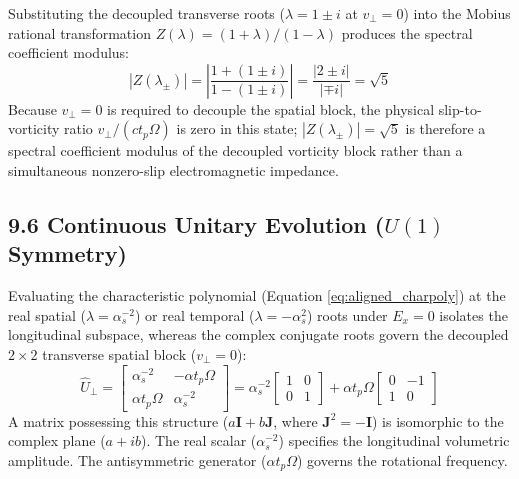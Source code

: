 Substituting the decoupled transverse roots ($\lambda = 1 \pm i$ at $v_\perp = 0$) into the Mobius rational transformation $Z(\lambda) = (1 + \lambda)/(1 - \lambda)$ produces the spectral coefficient modulus: %
\begin{equation}
    |Z(\lambda_\pm)| = \left| \frac{1 + (1 \pm i)}{1 - (1 \pm i)} \right| = \frac{|2 \pm i|}{|\mp i|} = \sqrt{5} %
\end{equation}
Because $v_\perp = 0$ is required to decouple the spatial block, the physical slip-to-vorticity ratio $v_\perp / (c t_p \Omega)$ is zero in this state; $|Z(\lambda_\pm)| = \sqrt{5}$ is therefore a spectral coefficient modulus of the decoupled vorticity block rather than a simultaneous nonzero-slip electromagnetic impedance. %




\subsection*{9.6 Continuous Unitary Evolution ($U(1)$ Symmetry)} 
Evaluating the characteristic polynomial (Equation \ref{eq:aligned_charpoly}) at the real spatial ($\lambda = \alpha_s^{-2}$) or real temporal ($\lambda = -\alpha_s^2$) roots under $E_x = 0$ isolates the longitudinal subspace, whereas the complex conjugate roots govern the decoupled $2 \times 2$ transverse spatial block ($v_\perp = 0$): %
\begin{equation} 
    \hat{U}_{\perp} = \begin{bmatrix} \alpha_s^{-2} & -\alpha t_p \Omega \\ \alpha t_p \Omega & \alpha_s^{-2} \end{bmatrix} = \alpha_s^{-2} \begin{bmatrix} 1 & 0 \\ 0 & 1 \end{bmatrix} + \alpha t_p \Omega \begin{bmatrix} 0 & -1 \\ 1 & 0 \end{bmatrix} 
\end{equation} 
A matrix possessing this structure ($a\mathbf{I} + b\mathbf{J}$, where $\mathbf{J}^2 = -\mathbf{I}$) is isomorphic to the complex plane ($a + ib$). The real scalar ($\alpha_s^{-2}$) specifies the longitudinal volumetric amplitude. The antisymmetric generator ($\alpha t_p \Omega$) governs the rotational frequency. 

